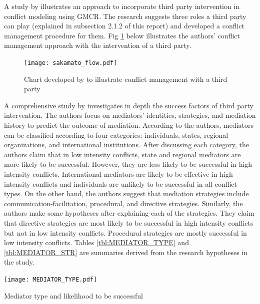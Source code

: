 \documentclass[letterpaper,12pt,titlepage,oneside,final]{book}
\begin{document}
A study by \citet{sakamoto2005} illustrates an approach to incorporate third party intervention in conflict modeling using GMCR. The research suggests three roles a third party can play (explained in subsection 2.1.2 of this report) and developed a conflict management procedure for them. Fig \ref{fig:sakamato_flow} below illustrates the authors' conflict management approach with the intervention of a third party.

\begin{center}
\begin{figure}[H]
\centering
\texttt{[image: sakamato\_flow.pdf]}

\caption{Chart developed by \citet{sakamoto2005} to illustrate conflict management with a third party}

\label{fig:sakamato_flow}
\end{figure}
\end{center}

A comprehensive study by \citet{bercovitch2006} investigates in depth the success factors of third party intervention. The authors focus on mediators' identities, strategies, and mediation history to predict the outcome of mediation. According to the authors, mediators can be classified according to four categories: individuals, states, regional organizations, and international institutions. After discussing each category, the authors claim that in low intensity conflicts, state and regional mediators are more likely to be successful. However, they are less likely to be successful in high intensity conflicts. International mediators are likely to be effective in high intensity conflicts and individuals are unlikely to be successful in all conflict types.
On the other hand, the authors suggest that mediation strategies include communication-facilitation, procedural, and directive strategies. Similarly, the authors make some hypotheses after explaining each of the strategies. They claim that directive strategies are most likely to be successful in high intensity conflicts but not in low intensity conflicts. Procedural strategies are mostly successful in low intensity conflicts. Tables \ref{tbl:MEDIATOR_TYPE} and \ref{tbl:MEDIATOR_STR} are summaries derived from the research hypotheses in the study. 

\begin{center}

\begin{table}[H]
\centering
\texttt{[image: MEDIATOR\_TYPE.pdf]}

\caption{Mediator type and likelihood to be successful}

\label{tbl:MEDIATOR_TYPE}
\end{table}

\end{center}
\end{document}

